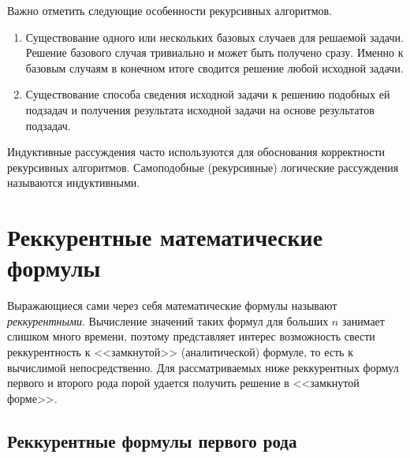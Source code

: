 Важно отметить следующие особенности рекурсивных алгоритмов.
\begin{enumerate}
    \item Существование одного или нескольких базовых случаев для решаемой задачи. Решение базового случая тривиально и может быть получено сразу. Именно к базовым случаям в конечном итоге сводится решение любой исходной задачи.
    \item Существование способа сведения исходной задачи к решению подобных ей подзадач и получения результата исходной задачи на основе результатов подзадач.
\end{enumerate}

Индуктивные рассуждения часто используются для обоснования корректности рекурсивных алгоритмов. Самоподобные (рекурсивные) логические рассуждения называются индуктивными.


\section{Реккурентные математические формулы}

Выражающиеся сами через себя математические формулы называют \emph{реккурентными}. Вычисление значений таких формул для больших $n$ занимает слишком много времени, поэтому представляет интерес возможность свести реккурентность к <<замкнутой>> (аналитической) формуле, то есть к вычислимой непосредственно. Для рассматриваемых ниже реккурентных формул первого и второго рода порой удается получить решение в <<замкнутой форме>>.


\subsection{Реккурентные формулы первого рода}

